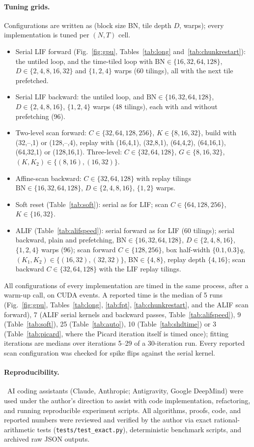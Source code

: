\documentclass[10pt]{article}
\newcounter{algo}
\theoremstyle{remark}
\begin{document}
\paragraph{Tuning grids.} Configurations are written as (block size BN, tile depth $D$, warps); every implementation is tuned per $(N,T)$ cell.
\begin{itemize}[leftmargin=*]
\item Serial LIF forward (Fig.~\ref{fig:gpu}, Tables~\ref{tab:long} and~\ref{tab:chunkrestart}): the untiled loop, and the time-tiled loop with $\mathrm{BN}\in\{16,32,64,128\}$, $D\in\{2,4,8,16,32\}$ and $\{1,2,4\}$ warps (60 tilings), all with the next tile prefetched.
\item Serial LIF backward: the untiled loop, and $\mathrm{BN}\in\{16,32,64,128\}$, $D\in\{2,4,8,16\}$, $\{1,2,4\}$ warps (48 tilings), each with and without prefetching (96).
\item Two-level scan forward: $C\in\{32,64,128,256\}$, $K\in\{8,16,32\}$, build with (32,--,1) or (128,--,4), replay with (16,4,1), (32,8,1), (64,4,2), (64,16,1), (64,32,1) or (128,16,1). Three-level: $C\in\{32,64,128\}$, $G\in\{8,16,32\}$, $(K,K_2)\in\{(8,16),(16,32)\}$.
\item Affine-scan backward: $C\in\{32,64,128\}$ with replay tilings $\mathrm{BN}\in\{16,32,64,128\}$, $D\in\{2,4,8,16\}$, $\{1,2\}$ warps.
\item Soft reset (Table~\ref{tab:soft}): serial as for LIF; scan $C\in\{64,128,256\}$, $K\in\{16,32\}$.
\item ALIF (Table~\ref{tab:alifspeed}): serial forward as for LIF (60 tilings); serial backward, plain and prefetching, $\mathrm{BN}\in\{16,32,64,128\}$, $D\in\{2,4,8,16\}$, $\{1,2,4\}$ warps (96); scan forward $C\in\{128,256\}$, box half-width $\{0.1,0.3\}q$, $(K_1,K_2)\in\{(16,32),(32,32)\}$, $\mathrm{BN}\in\{4,8\}$, replay depth $\{4,16\}$; scan backward $C\in\{32,64,128\}$ with the LIF replay tilings.
\end{itemize}
All configurations of every implementation are timed in the same process, after a warm-up call, on CUDA events. A reported time is the median of 5 runs (Fig.~\ref{fig:gpu}, Tables~\ref{tab:long}, \ref{tab:fpt}, \ref{tab:chunkrestart}, and the ALIF scan forward), 7 (ALIF serial kernels and backward passes, Table~\ref{tab:alifspeed}), 9 (Table~\ref{tab:soft}), 25 (Table~\ref{tab:auto}), 10 (Table~\ref{tab:shdtime}) or 3 (Table~\ref{tab:picard}, where the Picard iteration itself is timed once); fitting iterations are medians over iterations 5--29 of a 30-iteration run. Every reported scan configuration was checked for spike flips against the serial kernel.

\paragraph{Reproducibility.} \CODEAVAIL\ AI coding assistants (Claude, Anthropic; Antigravity, Google DeepMind) were used under the author's direction to assist with code implementation, refactoring, and running reproducible experiment scripts. All algorithms, proofs, code, and reported numbers were reviewed and verified by the author via exact rational-arithmetic tests (\texttt{tests/test\_exact.py}), deterministic benchmark scripts, and archived raw JSON outputs.
\end{document}

